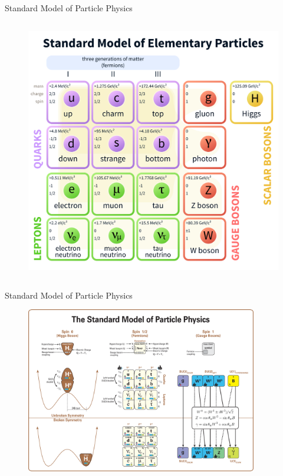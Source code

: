 \documentclass{beamer}
\begin{document}
\begin{frame}{Standard Model of Particle Physics}
\begin{columns}
\begin{column}{0.6\textwidth}
\begin{figure}
                \includegraphics[scale=0.14]{figures/Standard_Model_of_Elementary_Particles.png}
            \end{figure}
        \end{column}
    \end{columns}
\end{frame}

\begin{frame}{Standard Model of Particle Physics}
    \begin{figure}
        \includegraphics[width=0.9\textwidth]{figures/Standard_Model_Of_Particle_Physics--Most_Complete_Diagram.png}
    \end{figure}
\end{frame}
\end{document}

